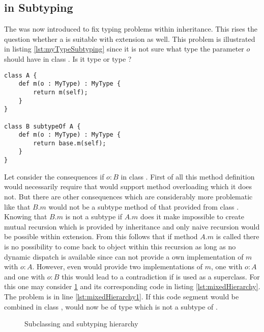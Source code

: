 \subsection{\mytype in Subtyping}
\label{ssec:mytypeInSubtype}
The \mytype was now introduced to fix typing problems within
inheritance. This rises the question whether a \mytype is suitable
with extension as well. This problem is illustrated in listing
\ref{lst:myTypeSubtyping} since it is not sure what type the parameter
$o$ should have in class \B. Is it type \B or type \A? 

\begin{lstlisting}[float,language=ooplss,caption=\mytype within subtyping contexts,label=lst:myTypeSubtyping]
class A {
	def m(o : MyType) : MyType {
		return m(self);
	}
}

class B subtypeOf A {
	def m(o : MyType) : MyType {
		return base.m(self);
	}
}
\end{lstlisting}

Let consider the consequences if $o : B$ in class \B. First of all this
method definition would necessarily require that \ooplss would support
method overloading which it does not. But there are other consequences which
are considerably more problematic like that $B.m$ would not be a subtype method of that
provided from class \A. Knowing that $B.m$ is not a subtype if $A.m$ does
it make impossible to create mutual recursion which is provided by inheritance
and only naive recursion would be possible within extension. From this follows
that if method $A.m$ is called there is no possibility to come back to object \B 
within this recursion as long as no dynamic dispatch is available since \B can 
not provide a own implementation of $m$ with $o : A$. However, even \B would
provide two implementations of $m$, one with $o : A$ and one with $o : B$ this
would lead to a contradiction if \B is used as a superclass. For this one may
consider \cref{fig:hierarchy} and its corresponding code in listing
\ref{lst:mixedHierarchy}. The problem is in line \ref{lst:mixedHierarchy1}. 
If this code segment would be combined in class \C, \self would now be of type
\C which is not a subtype of \A.

\begin{figure}[ht]
	\centering
	\caption{Subclassing and subtyping hierarchy}
	\label{fig:hierarchy}
\end{figure}

